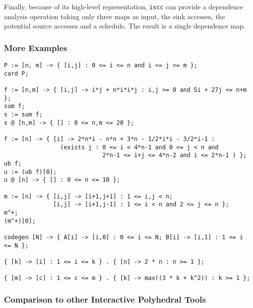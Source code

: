 Finally, because of its high-level representation, {\tt iscc} can
provide a dependence analysis operation taking only three maps as input,
the sink accesses, the potential source accesses and a schedule.
The result is a single dependence map.


\subsubsection{More Examples}
\begin{verbatim}
P := [n, m] -> { [i,j] : 0 <= i <= n and i <= j <= m };
card P;

f := [n,m] -> { [i,j] -> i*j + n*i*i*j : i,j >= 0 and 5i + 27j <= n+m };
sum f;
s := sum f;
s @ [n,m] -> { [] : 0 <= n,m <= 20 };

f := [n] -> { [i] -> 2*n*i - n*n + 3*n - 1/2*i*i - 3/2*i-1 :
                (exists j : 0 <= i < 4*n-1 and 0 <= j < n and
                            2*n-1 <= i+j <= 4*n-2 and i <= 2*n-1 ) };
ub f;
u := (ub f)[0];
u @ [n] -> { [] : 0 <= n <= 10 };

m := [n] -> { [i,j] -> [i+1,j+1] : 1 <= i,j < n;
              [i,j] -> [i+1,j-1] : 1 <= i < n and 2 <= j <= n };
m^+;
(m^+)[0];

codegen [N] -> { A[i] -> [i,0] : 0 <= i <= N; B[i] -> [i,1] : 1 <= i <= N };

{ [k] -> [i] : 1 <= i <= k } . { [n] -> 2 * n : n >= 1 };

{ [m] -> [c] : 1 <= c <= m } . { [k] -> max((3 * k + k^2)) : k >= 1 };
\end{verbatim}

\subsubsection{Comparison to other Interactive Polyhedral Tools}

